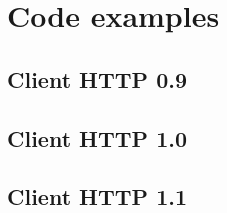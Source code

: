 \chapter{Code examples}
\section{Client HTTP 0.9}

\section{Client HTTP 1.0}

\section{Client HTTP 1.1}
